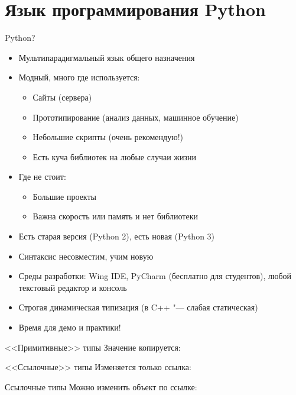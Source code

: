 \section{Язык программирования Python}

\begin{frame}[t]{Python?}
	\begin{itemize}
		\item Мультипарадигмальный язык общего назначения
		\item Модный, много где используется:
			\begin{itemize}
				\item Сайты (сервера)
				\item Прототипирование (анализ данных, машинное обучение)
				\item Небольшие скрипты (очень рекомендую!)
				\item Есть куча библиотек на любые случаи жизни
			\end{itemize}
		\item Где не стоит:
			\begin{itemize}
				\item Большие проекты
				\item Важна скорость или память и нет библиотеки
			\end{itemize}
		\item Есть старая версия (Python 2), есть новая (Python 3)
		\item Синтаксис несовместим, учим новую
		\item Среды разработки: Wing IDE, PyCharm (бесплатно для студентов), любой текстовый редактор и консоль
		\item Строгая динамическая типизация (в C++ "--- слабая статическая)
		\item Время для демо и практики!
	\end{itemize}
\end{frame}

\begin{frame}[t]{<<Примитивные>> типы}
	Значение копируется:
\end{frame}

\begin{frame}[t]{<<Ссылочные>> типы}
	Изменяется только ссылка:
\end{frame}

\begin{frame}[t]{Ссылочные типы}
	Можно изменить объект по ссылке:
\end{frame}


